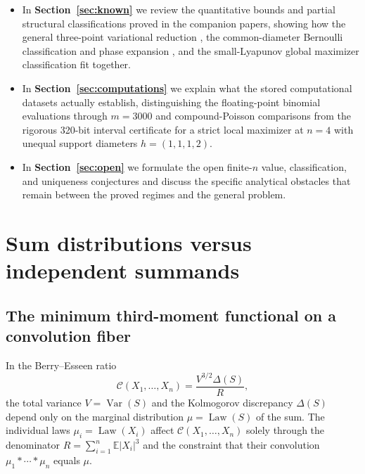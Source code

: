 \documentclass[11pt]{article}
\numberwithin{equation}{section}
\theoremstyle{definition}
\theoremstyle{remark}
\DeclareMathOperator{\Var}{Var}
\DeclareMathOperator{\Law}{Law}
\newcommand{\E}{\mathbb E}
\begin{document}
\begin{itemize}[leftmargin=2em]
\item In \textbf{Section~\ref{sec:known}} we review the quantitative bounds
and partial structural classifications proved in the companion papers,
showing how the general three-point variational reduction
\citep{BellExtremizers2026}, the common-diameter Bernoulli classification and
phase expansion \citep{BellBernoulli2026}, and the small-Lyapunov global
maximizer classification \citep{BellSmallStructure2026} fit together.

\item In \textbf{Section~\ref{sec:computations}} we explain what the stored
computational datasets actually establish, distinguishing the floating-point
binomial evaluations through $m=3000$ and compound-Poisson comparisons from
the rigorous 320-bit interval certificate for a strict local maximizer at
$n=4$ with unequal support diameters $h=(1,1,1,2)$.

\item In \textbf{Section~\ref{sec:open}} we formulate the open finite-$n$
value, classification, and uniqueness conjectures and discuss the specific
analytical obstacles that remain between the proved regimes and the general
problem.
\end{itemize}

\section{Sum distributions versus independent summands}\label{sec:factorization}

\subsection{The minimum third-moment functional on a convolution fiber}

In the Berry--Esseen ratio
\[
 \mathcal C(X_1,\ldots,X_n)=\frac{V^{3/2}\Delta(S)}{R},
\]
the total variance $V=\Var(S)$ and the Kolmogorov discrepancy $\Delta(S)$
depend only on the marginal distribution $\mu=\Law(S)$ of the sum. The
individual laws $\mu_i=\Law(X_i)$ affect $\mathcal C(X_1,\ldots,X_n)$ solely
through the denominator $R=\sum_{i=1}^n\E|X_i|^3$ and the constraint that
their convolution $\mu_1*\cdots*\mu_n$ equals $\mu$.
\end{document}
